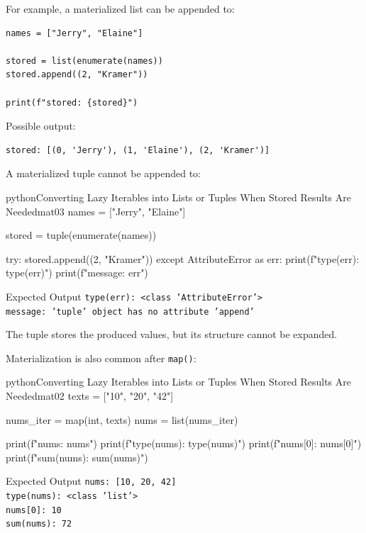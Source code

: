 \documentclass[a4paper,twoside]{report}
\begin{document}
For example, a materialized list can be appended to:

\begin{verbatim}
names = ["Jerry", "Elaine"]

stored = list(enumerate(names))
stored.append((2, "Kramer"))

print(f"stored: {stored}")
\end{verbatim}

Possible output:

\begin{verbatim}
stored: [(0, 'Jerry'), (1, 'Elaine'), (2, 'Kramer')]
\end{verbatim}

A materialized tuple cannot be appended to:

\begin{codebox}[]{python}{Converting Lazy Iterables into Lists or Tuples When Stored Results Are Needed}{mat03}
names = ["Jerry", "Elaine"]

stored = tuple(enumerate(names))

try:
    stored.append((2, "Kramer"))
except AttributeError as err:
    print(f"type(err): {type(err)}")
    print(f"message: {err}")
\end{codebox}


\begin{iobox}{Expected Output}
\texttt{type(err): <class 'AttributeError'>} \\
\texttt{message: 'tuple' object has no attribute 'append'} \\
\end{iobox}


The tuple stores the produced values, but its structure cannot be expanded.

Materialization is also common after \texttt{map()}:

\begin{codebox}[]{python}{Converting Lazy Iterables into Lists or Tuples When Stored Results Are Needed}{mat02}
texts = ["10", "20", "42"]

nums_iter = map(int, texts)
nums = list(nums_iter)

print(f"nums: {nums}")
print(f"type(nums): {type(nums)}")
print(f"nums[0]: {nums[0]}")
print(f"sum(nums): {sum(nums)}")
\end{codebox}


\begin{iobox}{Expected Output}
\texttt{nums: [10, 20, 42]} \\
\texttt{type(nums): <class 'list'>} \\
\texttt{nums[0]: 10} \\
\texttt{sum(nums): 72} \\
\end{iobox}
\end{document}
